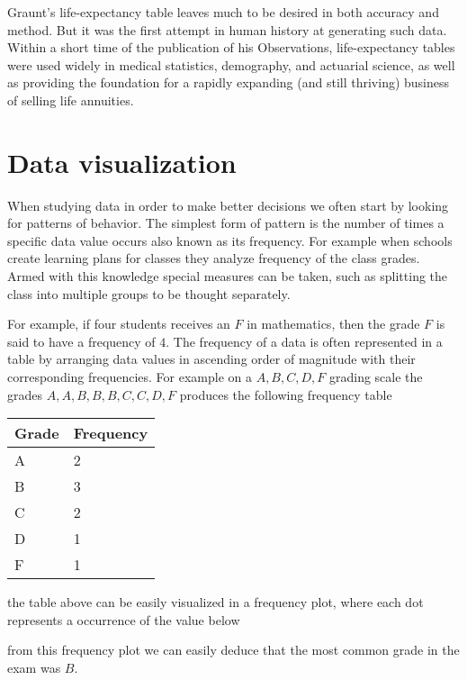 Graunt’s life-expectancy table leaves much to be desired in both accuracy and method. But it was the first attempt in human history at generating such data. Within a short time of the publication of his Observations, life-expectancy tables were used widely in medical statistics, demography, and actuarial science, as well as providing the foundation for a rapidly expanding (and still thriving) business of selling life annuities.

\section{Data visualization}
When studying data in order to make better decisions we often start by looking for patterns of behavior. The simplest form of pattern is the number of times a specific data value occurs also known as its frequency. For example when schools create learning plans for classes they analyze frequency of the class grades. Armed with this knowledge special measures can be taken, such as splitting the class into multiple groups to be thought separately.

For example, if four students receives an $F$ in mathematics, then the grade $F$ is said to have a frequency of $4$. The frequency of a data is often represented in a table by arranging data values in ascending order of magnitude with their corresponding frequencies. For example on a $A, B, C, D, F$ grading scale the grades $A, A, B, B, B, C, C, D, F$ produces the following frequency table
\begin{table}[H]
\centering
\begin{tabular}{|l|l|}
\hline
\textbf{Grade} & \textbf{Frequency} \\ \hline
A              & 2                  \\ \hline
B              & 3                  \\ \hline
C              & 2                  \\ \hline
D              & 1                  \\ \hline
F              & 1                  \\ \hline
\end{tabular}
\end{table}
the table above can be easily visualized in a frequency plot, where each dot represents a occurrence of the value below
\begin{figure}[H]
\centering
{}
\end{figure}
from this frequency plot we can easily deduce that the most common grade in the exam was $B$.

